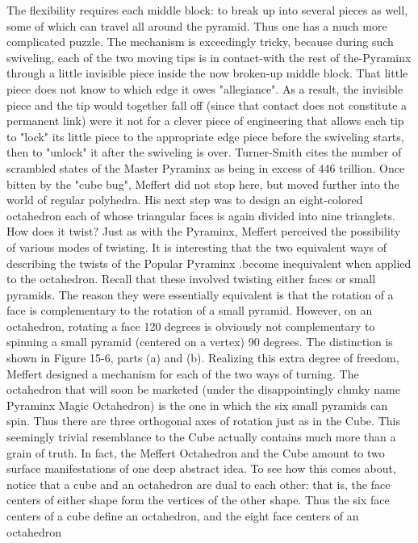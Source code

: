 The flexibility requires each middle block: to break up into several pieces as well,
some of which can travel all around the pyramid. Thus one has a much more
complicated puzzle. The mechanism is exceedingly tricky, because during such
swiveling, each of the two moving tips is in contact-with the rest of the-Pyraminx
through a little invisible piece inside the now broken-up middle block. That little
piece does not know to which edge it owes "allegiance". As a result, the invisible
piece and the tip would together fall off (since that contact does not constitute a
permanent link) were it not for a clever piece of engineering that allows each tip to
"lock" its little piece to the appropriate edge piece before the swiveling starts, then to
"unlock" it after the swiveling is over. Turner-Smith cites the number of scrambled
states of the Master Pyraminx as being in excess of 446 trillion.
        Once bitten by the "cube bug", Meffert did not stop here, but moved further
into the world of regular polyhedra. His next step was to design an eight-colored
octahedron each of whose triangular faces is again divided into nine trianglets. How
does it twist? Just as with the Pyraminx, Meffert perceived the possibility of various
modes of twisting. It is interesting that the two equivalent ways of describing the
twists of the Popular Pyraminx .become inequivalent when applied to the octahedron.
Recall that these involved twisting either faces or small pyramids. The reason they
were essentially equivalent is that the rotation of a face is complementary to the
rotation of a small pyramid. However, on an octahedron, rotating a face 120 degrees
is obviously not complementary to spinning a small pyramid (centered on a vertex) 90
degrees. The distinction is shown in Figure 15-6, parts (a) and (b). Realizing this extra
degree of freedom, Meffert designed a mechanism for each of the two ways of
turning.
        The octahedron that will soon be marketed (under the disappointingly clunky
name Pyraminx Magic Octahedron) is the one in which the six small pyramids can
spin. Thus there are three orthogonal axes of rotation just as in the Cube. This
seemingly trivial resemblance to the Cube actually contains much more than a grain
of truth. In fact, the Meffert Octahedron and
the Cube amount to two surface manifestations of one deep abstract idea. To see how
this comes about, notice that a cube and an octahedron are dual to each other: that is,
the face centers of either shape form the vertices of the other shape. Thus the six face
centers of a cube define an octahedron, and the eight face centers of an octahedron
